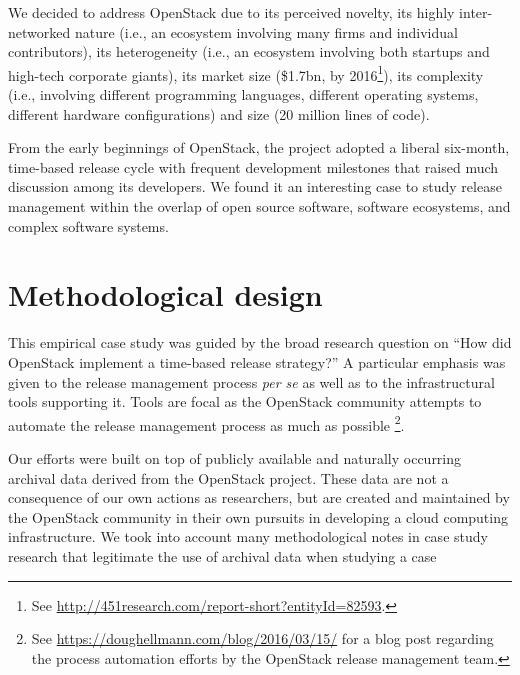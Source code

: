 \documentclass[dvipsnames]{interact}
\theoremstyle{plain}\newtheorem{theorem}{Theorem}[section]
\theoremstyle{definition}
\theoremstyle{remark}
\begin{document}
We decided to address OpenStack due to its perceived novelty, its highly inter-networked nature (i.e., an ecosystem involving many firms and individual contributors), its heterogeneity (i.e., an ecosystem involving both startups and high-tech corporate giants), its market size (\$1.7bn, by 2016\footnote{See \url{http://451research.com/report-short?entityId=82593}.}), its complexity (i.e., involving different programming languages, different operating systems, different hardware configurations) and size (20 million lines of code). 

From the early beginnings of OpenStack, the project  adopted a liberal six-month, time-based release cycle with frequent development milestones that raised much discussion among its developers. We found it an interesting case to study release management within the overlap of open source software, software ecosystems, and complex software systems. 

\section{Methodological design}
\label{sec:method}

This empirical case study was guided by the broad research question on ``How did OpenStack implement a time-based release strategy?'' A particular emphasis was given to the release management process \textit{per se} as well as to the infrastructural tools supporting it. Tools are focal as the OpenStack community attempts to automate the release management process as much as possible \footnote{See \url{https://doughellmann.com/blog/2016/03/15/} for a blog post regarding the process automation efforts by the OpenStack release management team.}. 


Our efforts were built on top of publicly available and naturally occurring archival data derived from the OpenStack project.  
These data are not a consequence of our own actions as researchers, but are created and maintained by the OpenStack community in their own pursuits in developing a cloud computing infrastructure. We took into account many methodological notes in case study research that legitimate the use of archival data when studying a case
\iftoggle{SE-research}{~\citep{runeson2008guidelines,EasterbrookSinger_et_al2008,Yin2011,Eisenhardt1989,FlynnSakakibara_et_al1990}.}{}
\iftoggle{IS-research}{~\citep{Eisenhardt1989,DubePare2003,Flyvbjerg2006,GibbertRuigrok_et_al2008,Yin2011}.}{}
\end{document}
